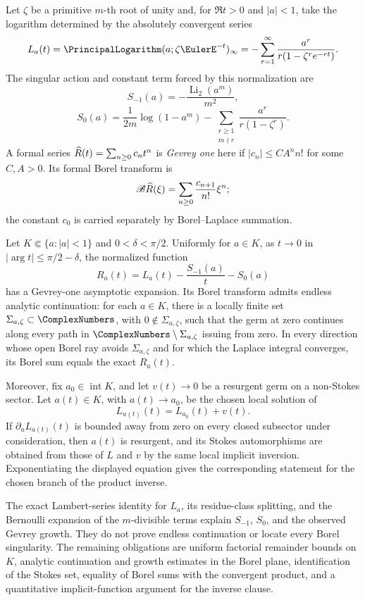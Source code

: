 Let \(\zeta\) be a primitive \(m\)-th root of unity and, for
\(\Re t>0\) and \(\lvert a\rvert<1\), take the logarithm determined by the
absolutely convergent series
\[
 L_a(t)
  =\PrincipalLogarithm(a;\zeta \EulerE^{-t})_\infty
  =-\sum_{r=1}^{\infty}
     \frac{a^r}{r(1-\zeta^re^{-rt})}.
\]
The singular action and constant term forced by this normalization are
\[
 S_{-1}(a)=-\frac{\operatorname{Li}_2(a^m)}{m^2},
\]
\[
 S_0(a)
  =\frac{1}{2m}\log(1-a^m)
   -\sum_{\substack{r\ge1\\m\nmid r}}
      \frac{a^r}{r(1-\zeta^r)}.
\]
A formal series \(\widehat{R}(t)=\sum_{n\ge0}c_nt^n\) is
\emph{Gevrey one} here if
\(\lvert c_n\rvert\le CA^n n!\) for some \(C,A>0\).  Its formal Borel
transform is
\[
\mathscr B\widehat{R}(\xi)
  =\sum_{n\ge0}\frac{c_{n+1}}{n!}\xi^n;
\]
the constant \(c_0\) is carried separately by Borel--Laplace summation.

\begin{conjecture}
\label{conj:cyclotomic-resurgent-inverse}
Let \(K\Subset\{a:\lvert a\rvert<1\}\) and
\(0<\delta<\pi/2\).  Uniformly for \(a\in K\), as \(t\to0\) in
\(\lvert\arg t\rvert\le\pi/2-\delta\), the normalized function
\[
 R_a(t)=L_a(t)-\frac{S_{-1}(a)}{t}-S_0(a)
\]
has a Gevrey-one asymptotic expansion.  Its Borel transform admits endless
analytic continuation: for each \(a\in K\), there is a locally finite set
\(\Sigma_{a,\zeta}\subset\ComplexNumbers\), with \(0\notin\Sigma_{a,\zeta}\), such that the
germ at zero continues along every path in
\(\ComplexNumbers\setminus\Sigma_{a,\zeta}\) issuing from zero.  In every direction whose
open Borel ray avoids \(\Sigma_{a,\zeta}\) and for which the Laplace integral
converges, its Borel sum equals the exact \(R_a(t)\).

Moreover, fix \(a_0\in\operatorname{int}K\), and let \(v(t)\to0\) be a
resurgent germ on a non-Stokes sector.  Let \(a(t)\in K\), with
\(a(t)\to a_0\), be the chosen local solution of
\[
 L_{a(t)}(t)=L_{a_0}(t)+v(t).
\]
If \(\partial_aL_{a(t)}(t)\) is bounded away from zero on every closed
subsector under consideration, then \(a(t)\) is resurgent, and its Stokes
automorphisms are obtained from those of \(L\) and \(v\) by the same local
implicit inversion.  Exponentiating the displayed equation gives the
corresponding statement for the chosen branch of the product inverse.
\end{conjecture}

The exact Lambert-series identity for \(L_a\), its residue-class splitting,
and the Bernoulli expansion of the \(m\)-divisible terms explain
\(S_{-1}\), \(S_0\), and the observed Gevrey growth.  They do not prove
endless continuation or locate every Borel singularity.  The remaining
obligations are uniform factorial remainder bounds on \(K\), analytic
continuation and growth estimates in the Borel plane, identification of the
Stokes set, equality of Borel sums with the convergent product, and a
quantitative implicit-function argument for the inverse clause.

